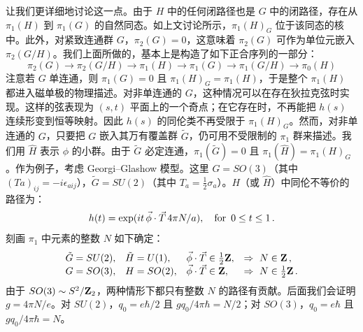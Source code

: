 让我们更详细地讨论这一点。由于 $H$ 中的任何闭路径也是 $G$ 中的闭路径，存在从 $\pi_1(H)$ 到 $\pi_1(G)$ 的自然同态。如上文讨论所示，$\pi_1(H)_G$ 位于该同态的核中。此外，对紧致连通群 $G$，$\pi_2(G)=0$，这意味着 $\pi_2(G)$ 可作为单位元嵌入 $\pi_2(G/H)$。我们上面所做的，基本上是构造了如下正合序列的一部分：
$$
\pi_2(G)\rightarrow\pi_2(G/H)\rightarrow\pi_1(H)\rightarrow 
\pi_1(G)\rightarrow\pi_1(G/H)\rightarrow\pi_0(H)
$$
注意若 $G$ 单连通，则 $\pi_1(G)=0$ 且 $\pi_1(H)_G=\pi_1(H)$，于是整个 $\pi_1(H)$ 都进入磁单极的物理描述。对非单连通的 $G$，这种情况可以在存在狄拉克弦时实现。这样的弦表现为 $(s,t)$ 平面上的一个奇点；在它存在时，不再能把 $h(s)$ 连续形变到恒等映射。因此 $h(s)$ 的同伦类不再受限于 $\pi_1(H)_G$。然而，对非单连通的 $G$，只要把 $G$ 嵌入其万有覆盖群 $\tilde G$，仍可用不受限制的 $\pi_1$ 群来描述。我们用 $\hat H$ 表示 $\phi$ 的小群。由于 $\tilde G$ 必定连通，$\pi_1(\tilde G)=0$ 且 $\pi_1(\hat H)= \pi_1(H)_G$。作为例子，考虑 Georgi–Glashow 模型。这里 $G = SO(3)$（其中 $(Ta)_{ij}=-i\epsilon_{aij}$），$\tilde{G} = SU(2)$（其中 $T_a=\frac{1}{2}\sigma_a$）。$H$（或 $\hat H$）中同伦不等价的路径为：
$$
h(t)=\exp(it\,\vec{\phi}\cdot\vec{T}\,4\pi N/a),\quad {\rm for}\,\,\, 
0 \leq t \leq 1\,.
$$
刻画 $\pi_1$ 中元素的整数 $N$ 如下确定：
$$
\begin{array}{llll}
\tilde G=SU(2),& \tilde H=U(1),& \vec{\phi}\cdot\vec{T}\in 
\frac{1}{2}{\bf Z},& \Rightarrow\,\, N \in {\bf Z}\,, \cr
G=SO(3),& H=SO(2),& \vec{\phi}\cdot\vec{T}\in {\bf Z},&
\Rightarrow\,\, N \in \frac{1}{2}{\bf Z}\,.
\end{array}
$$
由于 $SO(3)\sim S^2/{\bf Z}_2$，两种情形下都只有整数 $N$ 的路径有贡献。后面我们会证明 $g=4\pi N/e$。对 $SU(2)$，$q_0=e\hbar/2$ 且 $gq_0/4\pi\hbar=N/2$；对 $SO(3)$，$q_0=e\hbar$ 且 $gq_0/4\pi\hbar=N$。

